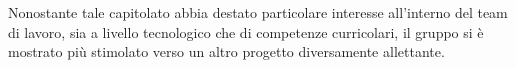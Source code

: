 Nonostante tale capitolato abbia destato particolare interesse all'interno del team di lavoro, sia a livello tecnologico che di competenze curricolari, il gruppo si è mostrato più stimolato verso un altro progetto diversamente allettante.